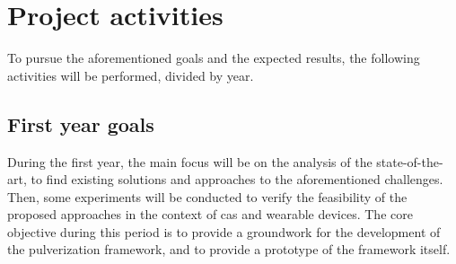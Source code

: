 \documentclass[12pt,a4paper]{article}
\begin{document}





\section{Project activities}\label{sec:activities}

To pursue the aforementioned goals and the expected results,
the following activities will be performed,
divided by year.

\subsection{First year goals}\label{subsec:first-year-activities}
During the first year,
the main focus will be on the analysis of the state-of-the-art,
to find existing solutions and approaches to the aforementioned challenges.
%
Then,
some experiments will be conducted to verify the feasibility of the proposed approaches
in the context of \ac{cas} and wearable devices.
%
The core objective during this period is to provide a groundwork for the development of the pulverization framework,
and to provide a prototype of the framework itself.
\end{document}
